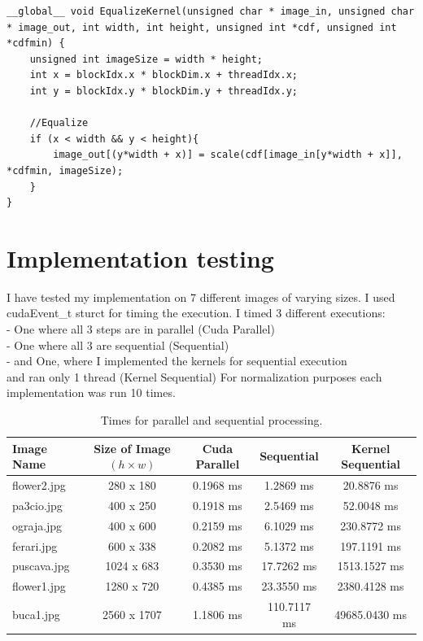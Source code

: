 \documentclass[10pt]{article}
\begin{document}
\begin{lstlisting}[style=cppstyle]
__global__ void EqualizeKernel(unsigned char * image_in, unsigned char * image_out, int width, int height, unsigned int *cdf, unsigned int *cdfmin) {
    unsigned int imageSize = width * height;
    int x = blockIdx.x * blockDim.x + threadIdx.x;
    int y = blockIdx.y * blockDim.y + threadIdx.y;
    
    //Equalize
    if (x < width && y < height){
        image_out[(y*width + x)] = scale(cdf[image_in[y*width + x]], *cdfmin, imageSize);
    }
}
\end{lstlisting}


\section{Implementation testing}

I have tested my implementation on 7 different images of varying sizes.
I used cudaEvent\_t sturct for timing the execution.
I timed 3 different executions: \\
- One where all 3 steps are in parallel (Cuda Parallel) \\
- One where all 3 are sequential (Sequential) \\
- and One, where I implemented the kernels for sequential execution\\
and ran only 1 thread (Kernel Sequential)
For normalization purposes each implementation was run 10 times.

\begin{table}[ht]
\centering
\begin{tabular}{lcccc}
\toprule
\textbf{Image Name} & \textbf{Size of Image $(h \times w)$} & \textbf{Cuda Parallel} & \textbf{ Sequential} & \textbf{Kernel Sequential} \\
\midrule
flower2.jpg & 280 x 180 & 0.1968 ms & 1.2869 ms & 20.8876 ms \\
pa3cio.jpg & 400 x 250 & 0.1918 ms & 2.5469 ms & 52.0048 ms \\
ograja.jpg & 400 x 600 & 0.2159 ms & 6.1029 ms & 230.8772 ms \\
ferari.jpg & 600 x 338 & 0.2082 ms & 5.1372 ms & 197.1191 ms \\
puscava.jpg & 1024 x 683 & 0.3530 ms & 17.7262 ms & 1513.1527 ms \\
flower1.jpg & 1280 x 720 & 0.4385 ms & 23.3550 ms & 2380.4128 ms \\
buca1.jpg & 2560 x 1707 & 1.1806 ms & 110.7117 ms & 49685.0430 ms \\
\bottomrule
\end{tabular}
\caption{Times for parallel and sequential processing.}
\label{tab:processing_times}
\end{table}
\end{document}
